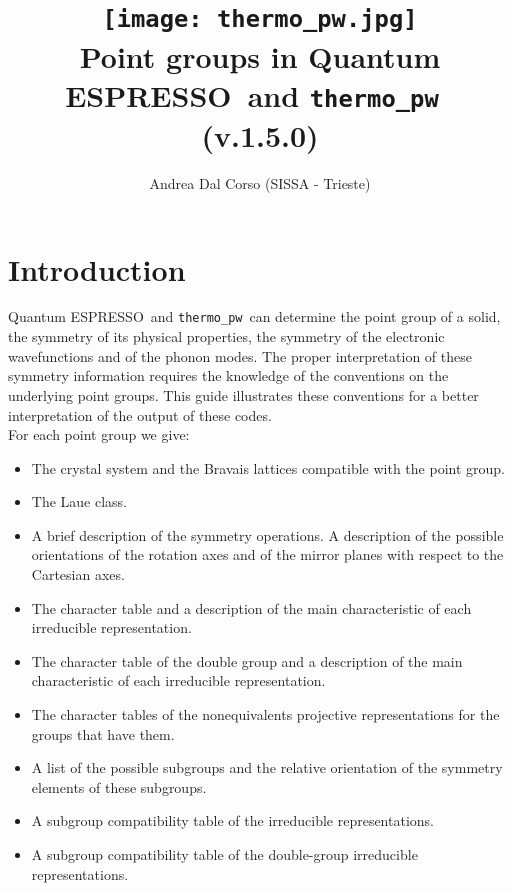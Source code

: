 \documentclass[12pt,a4paper]{article}
\def\version{1.5.0}
\def\qe{{\sc Quantum ESPRESSO}}
\def\thermo{\texttt{thermo\_pw}}
\begin{document}
 

\author{Andrea Dal Corso (SISSA - Trieste)}
\date{}

\title{
  \texttt{[image: thermo\_pw.jpg]} \\
  \vspace{3truecm}
  \Huge \color{blue} Point groups in \qe\ and \thermo\ \\
   (v.\version)
}

\maketitle

\newpage

\tableofcontents

\newpage
\newpage
\section{\color{coral}Introduction}
\qe\ and \thermo\ can determine the point group of a
solid, the symmetry of its physical properties, the symmetry
of the electronic wavefunctions and of the phonon modes. The proper interpretation
of these symmetry information requires the knowledge of the conventions on the 
underlying point groups. This guide illustrates these conventions
for a better interpretation of the output of these codes. \\
For each point group we give: 
\begin{itemize}

\item
The crystal system and the Bravais lattices compatible with the point
group.

\item
The Laue class.

\item
A brief description of the symmetry operations. 
A description of the possible orientations of the rotation axes and of the 
mirror planes with respect to the Cartesian axes.

\item
The character table and a description of the main characteristic of each 
irreducible representation.

\item
The character table of the double group and a description of the main 
characteristic of each irreducible representation.

\item
The character tables of the nonequivalents projective representations for the 
groups that have them.

\item
A list of the possible subgroups and the relative orientation of the symmetry
elements of these subgroups.

\item
A subgroup compatibility table of the irreducible representations.

\item
A subgroup compatibility table of the double-group irreducible representations. 

\end{itemize}
\end{document}
